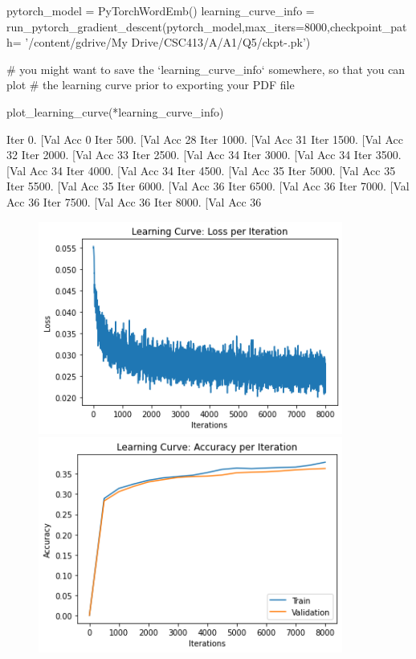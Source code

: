 \documentclass[12pt]{article}
\begin{document}
\begin{python}
pytorch_model = PyTorchWordEmb()
learning_curve_info = run_pytorch_gradient_descent(pytorch_model,max_iters=8000,checkpoint_path= '/content/gdrive/My Drive/CSC413/A/A1/Q5/ckpt-{}.pk')

# you might want to save the `learning_curve_info` somewhere, so that you can plot
# the learning curve prior to exporting your PDF file

plot_learning_curve(*learning_curve_info)
\end{python}
\begin{python}
Iter 0. [Val Acc 0%
Iter 500. [Val Acc 28%
Iter 1000. [Val Acc 31%
Iter 1500. [Val Acc 32%
Iter 2000. [Val Acc 33%
Iter 2500. [Val Acc 34%
Iter 3000. [Val Acc 34%
Iter 3500. [Val Acc 34%
Iter 4000. [Val Acc 34%
Iter 4500. [Val Acc 35%
Iter 5000. [Val Acc 35%
Iter 5500. [Val Acc 35%
Iter 6000. [Val Acc 36%
Iter 6500. [Val Acc 36%
Iter 7000. [Val Acc 36%
Iter 7500. [Val Acc 36%
Iter 8000. [Val Acc 36%
\end{python}
 \begin{figure}[H]
    \centering
    \includegraphics[width=100mm,scale=1]{5b1}\
    \includegraphics[width=100mm,scale=1]{5b2}\
\end{figure}
\end{document}
